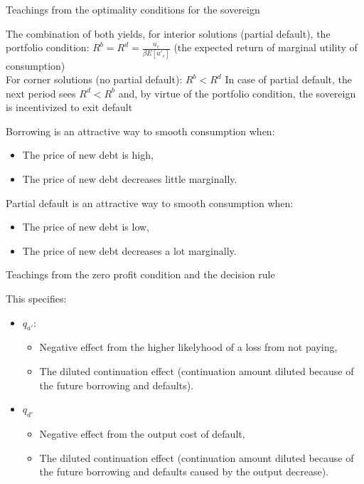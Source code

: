 \documentclass{beamer}
\begin{document}
\begin{frame}{Teachings from the optimality conditions for the sovereign}

The combination of both yields, for interior solutions (partial default), the portfolio condition:
\(R^b=R^d=\frac{u_c}{\beta E[u'_c]}\) (the expected return of marginal utility of consumption)\\
\bigbreak
For corner solutions (no partial default):
\(R^b<R^d\)
\bigbreak
In case of partial default, the next period sees \(R^d<R^b\) and, by virtue of the portfolio condition, the sovereign is incentivized to exit default

\bigbreak
Borrowing is an attractive way to smooth consumption when:
\begin{itemize}
    \item The price of new debt is high,
    \item The price of new debt decreases little marginally.
\end{itemize}
\bigbreak
Partial default is an attractive way to smooth consumption when:
\begin{itemize}
    \item The price of new debt is low,
    \item The price of new debt decreases a lot marginally.
\end{itemize}

\end{frame}

\begin{frame}{Teachings from the zero profit condition and the decision rule}

This specifies:
\begin{itemize}
    \item \(q_{a'}\):
    \begin{itemize}
        \item Negative effect from the higher likelyhood of a loss from not paying,
        \item The diluted continuation effect (continuation amount diluted because of the future borrowing and defaults).
    \end{itemize}
    \item \(q_{d'}\)
    \begin{itemize}
        \item Negative effect from the output cost of default,
        \item The diluted continuation effect (continuation amount diluted because of the future borrowing and defaults caused by the output decrease).
    \end{itemize}
\end{itemize}

\end{frame}
\end{document}
